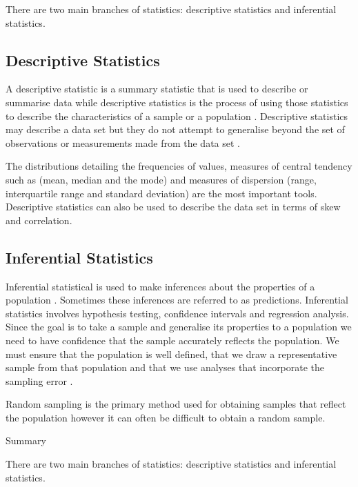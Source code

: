 \documentclass[
]{book}
\begin{document}
There are two main branches of statistics: descriptive statistics and inferential statistics.

\hypertarget{descriptive-statistics}{%
\subsection{Descriptive Statistics}\label{descriptive-statistics}}

A descriptive statistic is a summary statistic that is used to describe or summarise data while descriptive statistics is the process of using those statistics to describe the characteristics of a sample or a population \citep{Witte2017}. Descriptive statistics may describe a data set but they do not attempt to generalise beyond the set of observations or measurements made from the data set \citep{Frost2019}.

The distributions detailing the frequencies of values, measures of central tendency such as (mean, median and the mode) and measures of dispersion (range, interquartile range and standard deviation) are the most important tools. Descriptive statistics can also be used to describe the data set in terms of skew and correlation.

\hypertarget{inferential-statistics}{%
\subsection{Inferential Statistics}\label{inferential-statistics}}

Inferential statistical is used to make inferences about the properties of a population \citep{Witte2017}. Sometimes these inferences are referred to as predictions. Inferential statistics involves hypothesis testing, confidence intervals and regression analysis. Since the goal is to take a sample and generalise its properties to a population we need to have confidence that the sample accurately reflects the population. We must ensure that the population is well defined, that we draw a representative sample from that population and that we use analyses that incorporate the sampling error \citep{Frost2019}.

Random sampling is the primary method used for obtaining samples that reflect the population however it can often be difficult to obtain a random sample.

Summary

There are two main branches of statistics: descriptive statistics and inferential statistics.
\end{document}
